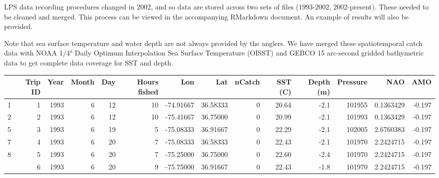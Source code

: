 \documentclass[
]{article}
\let\origtable\table
\let\endorigtable\endtable
\renewenvironment{table}[1][2] {
    \expandafter\origtable\expandafter[H]
} {
    \endorigtable
}
\begin{document}
LPS data recording procedures changed in 2002, and so data are stored across two sets of files (1993-2002, 2002-present). These needed to be cleaned and merged. This process can be viewed in the accompanying RMarkdown document. An example of results will also be provided.

Note that sea surface temperature and water depth are not always provided by the anglers. We have merged these spatiotemporal catch data with NOAA 1/4° Daily Optimum Interpolation Sea Surface Temperature (OISST) and GEBCO 15 arc-second gridded bathymetric data to get complete data coverage for SST and depth.

\begin{landscape}\begin{table}[H]

\caption{\label{tab:mergelps}American Large Pelagic Survey example}
\centering
\begin{tabular}[t]{lrrrrrrrrrrrrr}
\toprule
  & Trip
ID & Year & Month & Day & Hours
fished & Lon & Lat & nCatch & SST
(C) & Depth
(m) & Pressure & NAO & AMO\\
\midrule
1 & 1 & 1993 & 6 & 12 & 10 & -74.91667 & 36.58333 & 0 & 20.64 & -2.1 & 101955 & 0.1363429 & -0.197\\
2 & 2 & 1993 & 6 & 12 & 10 & -75.41667 & 36.75000 & 0 & 20.99 & -2.1 & 101993 & 0.1363429 & -0.197\\
5 & 3 & 1993 & 6 & 19 & 5 & -75.08333 & 36.91667 & 0 & 22.29 & -2.1 & 102005 & 2.6760383 & -0.197\\
7 & 4 & 1993 & 6 & 20 & 7 & -75.08333 & 36.58333 & 0 & 22.43 & -2.1 & 101970 & 2.2424715 & -0.197\\
8 & 5 & 1993 & 6 & 20 & 7 & -75.25000 & 36.75000 & 0 & 22.60 & -2.4 & 101970 & 2.2424715 & -0.197\\
\addlinespace
11 & 6 & 1993 & 6 & 20 & 9 & -75.75000 & 36.91667 & 0 & 22.43 & -1.8 & 101970 & 2.2424715 & -0.197\\
\bottomrule
\end{tabular}
\end{table}
\end{landscape}
\end{document}
